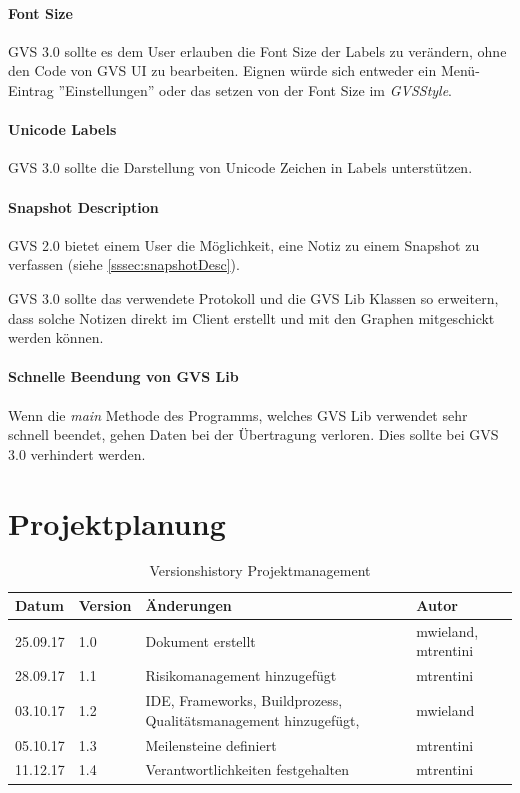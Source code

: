 \documentclass[11pt,a4paper,english,oneside]{book}
\numberwithin{equation}{chapter}
\begin{document}
	\subsubsection{Font Size}
	GVS 3.0 sollte es dem User erlauben die Font Size der Labels zu verändern, ohne den Code von GVS UI zu bearbeiten. Eignen würde sich entweder ein Menü-Eintrag ''Einstellungen'' oder das setzen von der Font Size im \textit{GVSStyle}.
	
	\subsubsection{Unicode Labels}
	GVS 3.0 sollte die Darstellung von Unicode Zeichen in Labels unterstützen.
	
	\subsubsection{Snapshot Description}
	GVS 2.0 bietet einem User die Möglichkeit, eine Notiz zu einem Snapshot zu verfassen (siehe \ref{sssec:snapshotDesc}).
	
	GVS 3.0 sollte das verwendete Protokoll und die GVS Lib Klassen so erweitern, dass solche Notizen direkt im Client erstellt und mit den Graphen mitgeschickt werden können.
	
	\subsubsection{Schnelle Beendung von GVS Lib}
	Wenn die \textit{main} Methode des Programms, welches GVS Lib verwendet sehr schnell beendet, gehen Daten bei der Übertragung verloren. Dies sollte bei GVS 3.0 verhindert werden.
	
	\chapter{Projektplanung}

	\begin{table}[h!]
		\centering
		\begin{tabularx}{\linewidth}{l l X l}
			\toprule 
			Datum & Version & Änderungen & Autor \\
			\midrule
			25.09.17 & 1.0 & Dokument erstellt & mwieland, mtrentini \\
			28.09.17 & 1.1 & Risikomanagement hinzugefügt & mtrentini \\
			03.10.17 & 1.2 & IDE, Frameworks, Buildprozess, Qualitätsmanagement hinzugefügt, & mwieland \\
			05.10.17 & 1.3 & Meilensteine definiert & mtrentini \\
			11.12.17 & 1.4 & Verantwortlichkeiten festgehalten & mtrentini \\
			\bottomrule 
		\end{tabularx} 
		\caption{Versionshistory Projektmanagement} 
	\end{table}
	
\end{document}
